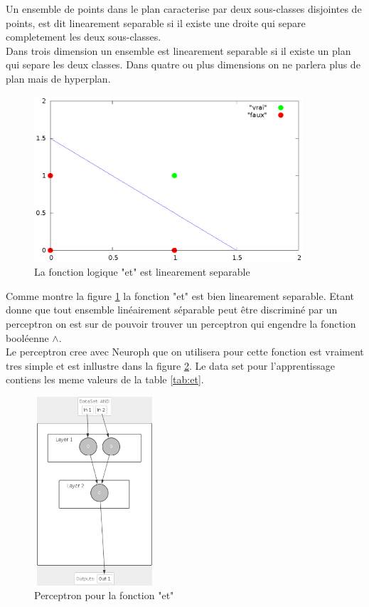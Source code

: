 \documentclass[twoside,openright,a4paper,11pt,french]{article}
\begin{document}
Un ensemble de points dans le plan caracterise par deux sous-classes disjointes
de points, est dit linearement separable si il existe une droite qui separe
completement les deux sous-classes.\\

Dans trois dimension un ensemble est linearement separable si il existe un plan
qui separe les deux classes. Dans quatre ou plus dimensions on ne parlera plus de
plan mais de hyperplan.


\begin{figure}[h]
\centering
\includegraphics[width=10cm]{./pics/and/and.eps}
\caption{La fonction logique "et" est linearement separable}
\label{fig:and}
\end{figure}


Comme montre la figure \ref{fig:and} la fonction "et" est bien linearement
separable. Etant donne que tout ensemble linéairement séparable peut être
discriminé par un perceptron on est sur de pouvoir trouver un perceptron qui
engendre la fonction booléenne $\land$.\\

Le perceptron cree avec Neuroph que on utilisera pour cette fonction 
est vraiment tres simple et est inllustre dans la figure \ref{fig:per_and}.
Le data set pour l'apprentissage contiens les meme valeurs de la table
\ref{tab:et}.

\begin{figure}[h]
\centering
\includegraphics[width=4.5cm,height=7cm]{./pics/perc_and.eps}
\caption{Perceptron pour la fonction "et"}
\label{fig:per_and}
\end{figure}
\end{document}
